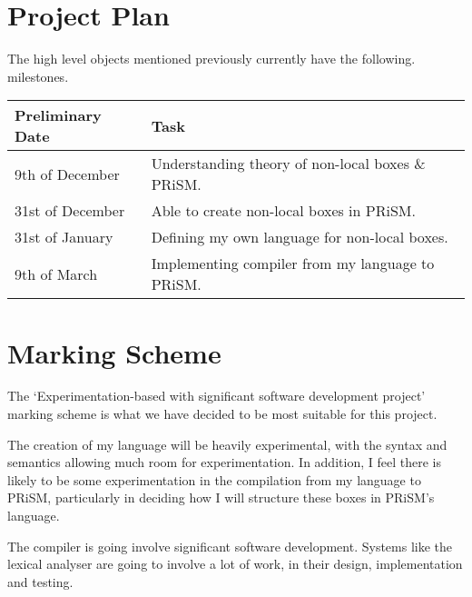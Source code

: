 \documentclass[11pt, a4paper]{article}
\begin{document}
\section{Project Plan} %
\label{sec:project_plan}
The high level objects mentioned previously currently have the following.
milestones.

\begin{center}
    \begin{tabular}{l | p{7.5cm}}
        Preliminary Date & Task \\
        \hline
        9th of December & Understanding theory of non-local boxes \& PRiSM. \\

        31st of December & Able to create non-local boxes in PRiSM. \\

        31st of January & Defining my own language for non-local boxes. \\

        9th of March & Implementing compiler from my language to PRiSM. \\
\end{tabular}
\end{center}


\section{Marking Scheme} %
\label{sec:marking_scheme}
The `Experimentation-based with significant software development project'
marking scheme is what we have decided to be most suitable for this project.

The creation of my language will be heavily experimental, with the syntax and
semantics allowing much room for experimentation. In addition, I feel there is
likely to be some experimentation in the compilation from my language to PRiSM,
particularly in deciding how I will structure these boxes in PRiSM's language.

The compiler is going involve significant software development. Systems like the
lexical analyser are going to involve a lot of work, in their design,
implementation and testing.




\end{document}
